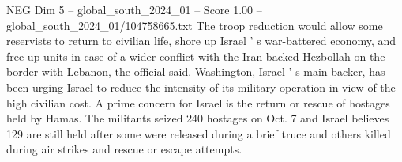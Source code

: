 \begin{textsample}{NEG Dim 5 – global\_south\_2024\_01 – Score 1.00 – global\_south\_2024\_01/104758665.txt}
The troop reduction would allow some reservists to return to civilian life, shore up Israel ' s war-battered economy, and free up units in case of a wider conflict with the Iran-backed Hezbollah on the border with Lebanon, the official said.
Washington, Israel ' s main backer, has been urging Israel to reduce the intensity of its military operation in view of the high civilian cost.
A prime concern for Israel is the return or rescue of hostages held by Hamas.
The militants seized 240 hostages on Oct. 7 and Israel believes 129 are still held after some were released during a brief truce and others killed during air strikes and rescue or escape attempts.

\end{textsample}
